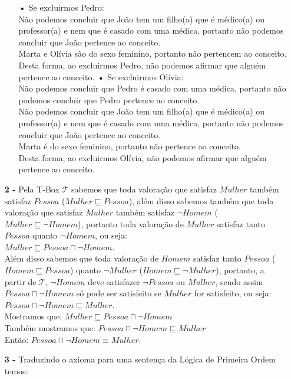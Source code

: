 \documentclass[12pt]{article}
\begin{document}
\begin{itemize}
\begin{itemize}
					\subitem\textbf{•}
					Se excluirmos Pedro:\\
					Não podemos concluir que João tem um filho(a) que é médico(a) ou
					professor(a) e nem que é casado com uma médica, portanto não podemos concluir que João
					pertence ao conceito.\\
					Marta e Olívia são do sexo feminino, portanto não pertencem ao conceito.\\
					Desta forma, ao excluirmos Pedro, não podemos afirmar que alguém pertence ao
					conceito.
					\newline
					\subitem\textbf{•}
					Se excluirmos Olívia:\\
					Não podemos concluir que Pedro é casado com uma médica, portanto não podemos concluir que 
					Pedro pertence ao conceito.\\
					Não podemos concluir que João tem um filho(a) que é médico(a) ou
					professor(a) e nem que é casado com uma médica, portanto não podemos concluir que João
					pertence ao conceito.\\
					Marta é do sexo feminino, portanto não pertence ao conceito.\\
					Desta forma, ao excluirmos Olívia, não podemos afirmar que alguém pertence ao
					conceito.
			\end{itemize}
		\newpage
		\item[\textbf{2 -}]
			\hfill\newline
			Pela T-Box $\mathcal{T}$ sabemos que toda valoração que satisfaz $Mulher$ também satisfaz
			$Pessoa$ ($Mulher \sqsubseteq Pessoa$), além disso sabemos também que toda valoração
			que satisfaz $Mulher$ também satisfaz $\neg Homem$ ($Mulher \sqsubseteq \neg Homem$),
			portanto toda valoração de $Mulher$ satisfaz tanto $Pessoa$ quanto $\neg Homem$, ou seja:\\ 
			$Mulher \sqsubseteq Pessoa \sqcap \neg Homem$.\\
			
			Além disso sabemos que toda valoração de $Homem$ satisfaz tanto $Pessoa$ 
			($Homem \sqsubseteq Pessoa$) quanto $\neg Mulher$ ($Homem \sqsubseteq \neg Mulher$),
			portanto, a partir de $\mathcal{T}$, $\neg Homem$ deve satisfazer $\neg Pessoa$ ou
			$Mulher$, sendo assim $Pessoa \sqcap \neg Homem$ só pode ser satisfeito se $Mulher$
			for satisfeito, ou seja:\\
			$Pessoa \sqcap \neg Homem \sqsubseteq Mulher$.\\
			
			Mostramos que: $Mulher \sqsubseteq Pessoa \sqcap \neg Homem$\\
			Também mostramos que: $Pessoa \sqcap \neg Homem \sqsubseteq Mulher$\\
			Então: $Pessoa \sqcap \neg Homem \equiv Mulher$.
		\item[\textbf{3 -}]
			\hfill\newline
			Traduzindo o axioma para uma sentença da Lógica de Primeira Ordem temos:\\
			

\end{itemize}
\end{document}
